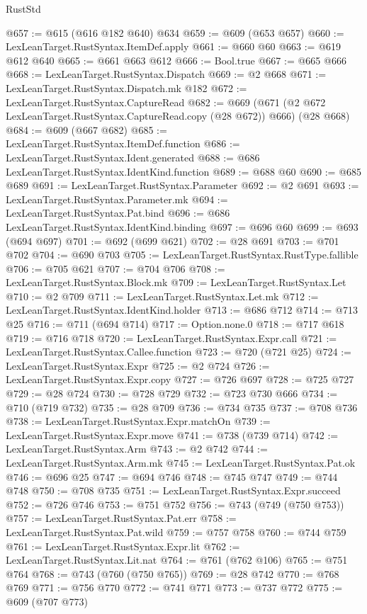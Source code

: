 \begin{lexlean}{RustStd}
\begin{coremodule}
@657 := @615 (@616 @182 @640) @634
@659 := @609 (@653 @657)
@660 := LexLeanTarget.RustSyntax.ItemDef.apply
@661 := @660 @60
@663 := @619 @612 @640
@665 := @661 @663 @612
@666 := Bool.true
@667 := @665 @666
@668 := LexLeanTarget.RustSyntax.Dispatch
@669 := @2 @668
@671 := LexLeanTarget.RustSyntax.Dispatch.mk @182
@672 := LexLeanTarget.RustSyntax.CaptureRead
@682 := @669 (@671 (@2 @672 LexLeanTarget.RustSyntax.CaptureRead.copy (@28 @672)) @666) (@28 @668)
@684 := @609 (@667 @682)
@685 := LexLeanTarget.RustSyntax.ItemDef.function
@686 := LexLeanTarget.RustSyntax.Ident.generated
@688 := @686 LexLeanTarget.RustSyntax.IdentKind.function
@689 := @688 @60
@690 := @685 @689
@691 := LexLeanTarget.RustSyntax.Parameter
@692 := @2 @691
@693 := LexLeanTarget.RustSyntax.Parameter.mk
@694 := LexLeanTarget.RustSyntax.Pat.bind
@696 := @686 LexLeanTarget.RustSyntax.IdentKind.binding
@697 := @696 @60
@699 := @693 (@694 @697)
@701 := @692 (@699 @621)
@702 := @28 @691
@703 := @701 @702
@704 := @690 @703
@705 := LexLeanTarget.RustSyntax.RustType.fallible
@706 := @705 @621
@707 := @704 @706
@708 := LexLeanTarget.RustSyntax.Block.mk
@709 := LexLeanTarget.RustSyntax.Let
@710 := @2 @709
@711 := LexLeanTarget.RustSyntax.Let.mk
@712 := LexLeanTarget.RustSyntax.IdentKind.holder
@713 := @686 @712
@714 := @713 @25
@716 := @711 (@694 @714)
@717 := Option.none.{0}
@718 := @717 @618
@719 := @716 @718
@720 := LexLeanTarget.RustSyntax.Expr.call
@721 := LexLeanTarget.RustSyntax.Callee.function
@723 := @720 (@721 @25)
@724 := LexLeanTarget.RustSyntax.Expr
@725 := @2 @724
@726 := LexLeanTarget.RustSyntax.Expr.copy
@727 := @726 @697
@728 := @725 @727
@729 := @28 @724
@730 := @728 @729
@732 := @723 @730 @666
@734 := @710 (@719 @732)
@735 := @28 @709
@736 := @734 @735
@737 := @708 @736
@738 := LexLeanTarget.RustSyntax.Expr.matchOn
@739 := LexLeanTarget.RustSyntax.Expr.move
@741 := @738 (@739 @714)
@742 := LexLeanTarget.RustSyntax.Arm
@743 := @2 @742
@744 := LexLeanTarget.RustSyntax.Arm.mk
@745 := LexLeanTarget.RustSyntax.Pat.ok
@746 := @696 @25
@747 := @694 @746
@748 := @745 @747
@749 := @744 @748
@750 := @708 @735
@751 := LexLeanTarget.RustSyntax.Expr.succeed
@752 := @726 @746
@753 := @751 @752
@756 := @743 (@749 (@750 @753))
@757 := LexLeanTarget.RustSyntax.Pat.err
@758 := LexLeanTarget.RustSyntax.Pat.wild
@759 := @757 @758
@760 := @744 @759
@761 := LexLeanTarget.RustSyntax.Expr.lit
@762 := LexLeanTarget.RustSyntax.Lit.nat
@764 := @761 (@762 @106)
@765 := @751 @764
@768 := @743 (@760 (@750 @765))
@769 := @28 @742
@770 := @768 @769
@771 := @756 @770
@772 := @741 @771
@773 := @737 @772
@775 := @609 (@707 @773)

\end{coremodule}
\end{lexlean}
